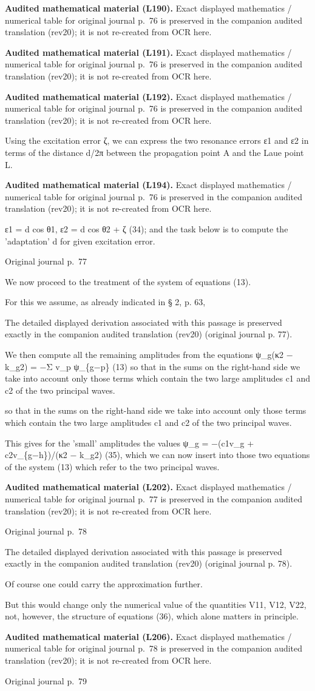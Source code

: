\documentclass[10pt]{article}
\newcommand{\origpage}[1]{\par\medskip\noindent\hfill{\small\color{notegray}Original journal p.~#1}\hfill\mbox{}\par\smallskip}
\newcommand{\mathref}[2]{\par\smallskip\noindent\colorbox{gray!8}{\parbox{0.95\linewidth}{\small\color{notegray}\textbf{Audited mathematical material (L#1).} Exact displayed mathematics / numerical table for original journal p.~#2 is preserved in the companion audited translation (rev20); it is not re-created from OCR here.}}\par\smallskip}
\begin{document}
\mathref{190}{76}
\mathref{191}{76}
\mathref{192}{76}
Using the excitation error ζ, we can express the two resonance errors ε1 and ε2 in terms of the distance d/2π between the propagation point A and the Laue point L.\par
\mathref{194}{76}
ε1 = d cos θ1, ε2 = d cos θ2 + ζ (34); and the task below is to compute the 'adaptation' d for given excitation error.\par
\origpage{77}
We now proceed to the treatment of the system of equations (13).\par
For this we assume, as already indicated in § 2, p. 63,\par
The detailed displayed derivation associated with this passage is preserved exactly in the companion audited translation (rev20) (original journal p. 77).\par
We then compute all the remaining amplitudes from the equations ψ\_g(κ2 − k\_g2) = −Σ v\_p ψ\_\{g−p\} (13) so that in the sums on the right-hand side we take into account only those terms which contain the two large amplitudes c1 and c2 of the two principal waves.\par
so that in the sums on the right-hand side we take into account only those terms which contain the two large amplitudes c1 and c2 of the two principal waves.\par
This gives for the 'small' amplitudes the values ψ\_g = −(c1v\_g + c2v\_\{g−h\})/(κ2 − k\_g2) (35), which we can now insert into those two equations of the system (13) which refer to the two principal waves.\par
\mathref{202}{77}
\origpage{78}
The detailed displayed derivation associated with this passage is preserved exactly in the companion audited translation (rev20) (original journal p. 78).\par
Of course one could carry the approximation further.\par
But this would change only the numerical value of the quantities V11, V12, V22, not, however, the structure of equations (36), which alone matters in principle.\par
\mathref{206}{78}
\origpage{79}
\end{document}
